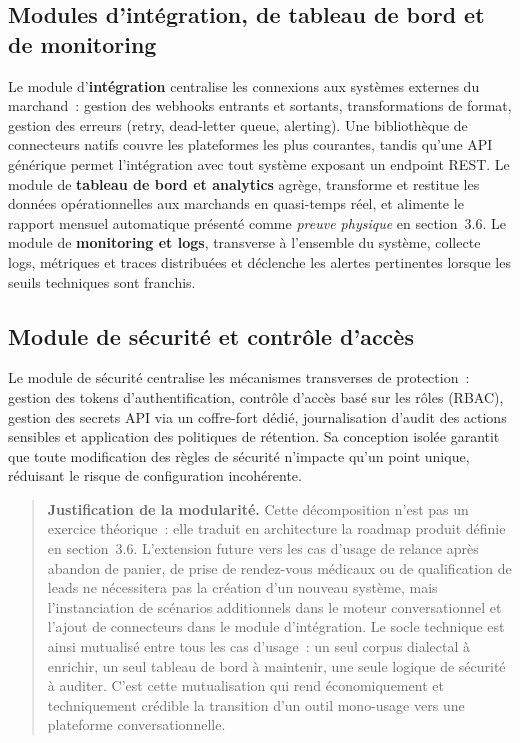 \subsection{Modules d'intégration, de tableau de bord et de monitoring}
\label{subsec:modules_horizontaux}

Le module d'\textbf{intégration} centralise les connexions aux systèmes externes du marchand~: gestion des webhooks entrants et sortants, transformations de format, gestion des erreurs (retry, dead-letter queue, alerting). Une bibliothèque de connecteurs natifs couvre les plateformes les plus courantes, tandis qu'une API générique permet l'intégration avec tout système exposant un endpoint REST. Le module de \textbf{tableau de bord et analytics} agrège, transforme et restitue les données opérationnelles aux marchands en quasi-temps réel, et alimente le rapport mensuel automatique présenté comme \emph{preuve physique} en section~3.6. Le module de \textbf{monitoring et logs}, transverse à l'ensemble du système, collecte logs, métriques et traces distribuées et déclenche les alertes pertinentes lorsque les seuils techniques sont franchis.

\subsection{Module de sécurité et contrôle d'accès}
\label{subsec:module_securite}

Le module de sécurité centralise les mécanismes transverses de protection~: gestion des tokens d'authentification, contrôle d'accès basé sur les rôles (RBAC), gestion des secrets API via un coffre-fort dédié, journalisation d'audit des actions sensibles et application des politiques de rétention. Sa conception isolée garantit que toute modification des règles de sécurité n'impacte qu'un point unique, réduisant le risque de configuration incohérente.

\begin{quote}
\textbf{Justification de la modularité.} Cette décomposition n'est pas un exercice théorique~: elle traduit en architecture la roadmap produit définie en section~3.6. L'extension future vers les cas d'usage de relance après abandon de panier, de prise de rendez-vous médicaux ou de qualification de leads ne nécessitera pas la création d'un nouveau système, mais l'instanciation de scénarios additionnels dans le moteur conversationnel et l'ajout de connecteurs dans le module d'intégration. Le socle technique est ainsi mutualisé entre tous les cas d'usage~: un seul corpus dialectal à enrichir, un seul tableau de bord à maintenir, une seule logique de sécurité à auditer. C'est cette mutualisation qui rend économiquement et techniquement crédible la transition d'un outil mono-usage vers une plateforme conversationnelle.
\end{quote}

